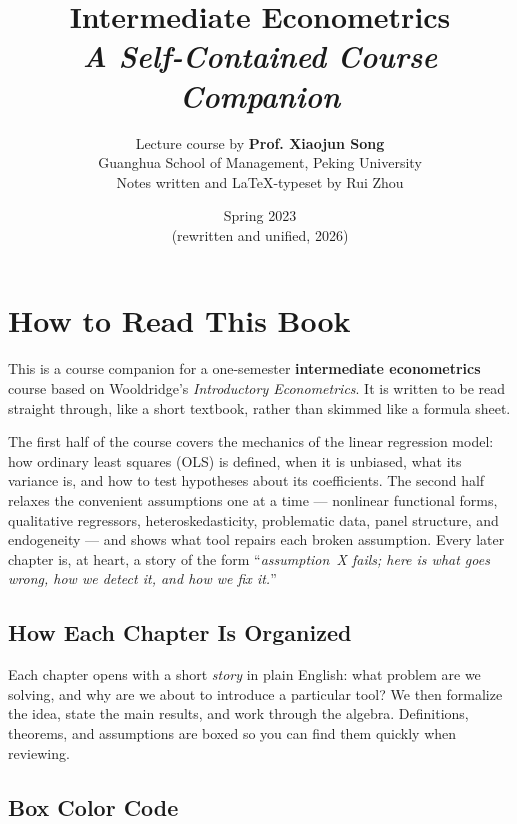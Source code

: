 \documentclass[oneside]{book}
\def\notetitle{Intermediate Econometrics}
\def\notesubtitle{A Self-Contained Course Companion}
\def\noteauthor{Lecture course by \textbf{Prof. Xiaojun Song} \\
    Guanghua School of Management, Peking University \\
    \vspace{0.5em}
    Notes written and {\LaTeX}-typeset by Rui Zhou}
\def\notedate{Spring 2023 \\ \small (rewritten and unified, 2026)}
\begin{document}
\title{\textbf{
    \LARGE{\notetitle}\\
    \vspace{0.5em}
    \large\textit{\notesubtitle}
    \vspace*{8\baselineskip}}
}
\author{\noteauthor}
\date{\notedate}

\maketitle
\newpage

\thispagestyle{empty}
\section*{How to Read This Book}

This is a course companion for a one-semester \textbf{intermediate econometrics} course based on Wooldridge's \emph{Introductory Econometrics}. It is written to be read straight through, like a short textbook, rather than skimmed like a formula sheet.

The first half of the course covers the mechanics of the linear regression model: how ordinary least squares (OLS) is defined, when it is unbiased, what its variance is, and how to test hypotheses about its coefficients. The second half relaxes the convenient assumptions one at a time --- nonlinear functional forms, qualitative regressors, heteroskedasticity, problematic data, panel structure, and endogeneity --- and shows what tool repairs each broken assumption. Every later chapter is, at heart, a story of the form ``\emph{assumption~X fails; here is what goes wrong, how we detect it, and how we fix it.}''

\subsection*{How Each Chapter Is Organized}

Each chapter opens with a short \emph{story} in plain English: what problem are we solving, and why are we about to introduce a particular tool? We then formalize the idea, state the main results, and work through the algebra. Definitions, theorems, and assumptions are boxed so you can find them quickly when reviewing.

\subsection*{Box Color Code}
\end{document}

